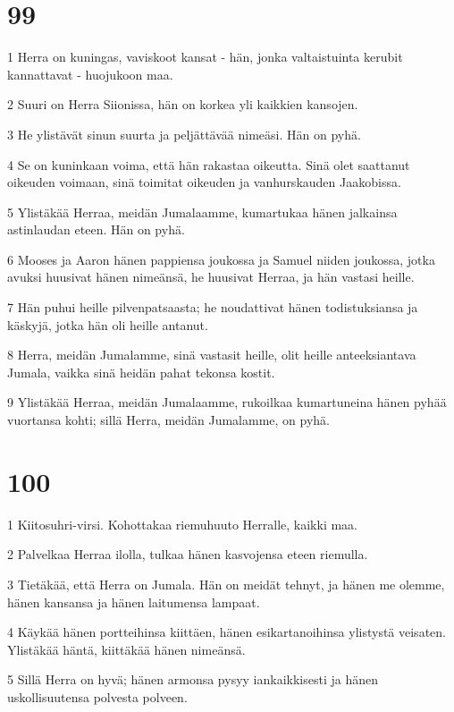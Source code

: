 \chapter{99}

\par 1 Herra on kuningas, vaviskoot kansat - hän, jonka valtaistuinta kerubit kannattavat - huojukoon maa.
\par 2 Suuri on Herra Siionissa, hän on korkea yli kaikkien kansojen.
\par 3 He ylistävät sinun suurta ja peljättävää nimeäsi. Hän on pyhä.
\par 4 Se on kuninkaan voima, että hän rakastaa oikeutta. Sinä olet saattanut oikeuden voimaan, sinä toimitat oikeuden ja vanhurskauden Jaakobissa.
\par 5 Ylistäkää Herraa, meidän Jumalaamme, kumartukaa hänen jalkainsa astinlaudan eteen. Hän on pyhä.
\par 6 Mooses ja Aaron hänen pappiensa joukossa ja Samuel niiden joukossa, jotka avuksi huusivat hänen nimeänsä, he huusivat Herraa, ja hän vastasi heille.
\par 7 Hän puhui heille pilvenpatsaasta; he noudattivat hänen todistuksiansa ja käskyjä, jotka hän oli heille antanut.
\par 8 Herra, meidän Jumalamme, sinä vastasit heille, olit heille anteeksiantava Jumala, vaikka sinä heidän pahat tekonsa kostit.
\par 9 Ylistäkää Herraa, meidän Jumalaamme, rukoilkaa kumartuneina hänen pyhää vuortansa kohti; sillä Herra, meidän Jumalamme, on pyhä.

\chapter{100}

\par 1 Kiitosuhri-virsi. Kohottakaa riemuhuuto Herralle, kaikki maa.
\par 2 Palvelkaa Herraa ilolla, tulkaa hänen kasvojensa eteen riemulla.
\par 3 Tietäkää, että Herra on Jumala. Hän on meidät tehnyt, ja hänen me olemme, hänen kansansa ja hänen laitumensa lampaat.
\par 4 Käykää hänen portteihinsa kiittäen, hänen esikartanoihinsa ylistystä veisaten. Ylistäkää häntä, kiittäkää hänen nimeänsä.
\par 5 Sillä Herra on hyvä; hänen armonsa pysyy iankaikkisesti ja hänen uskollisuutensa polvesta polveen.

